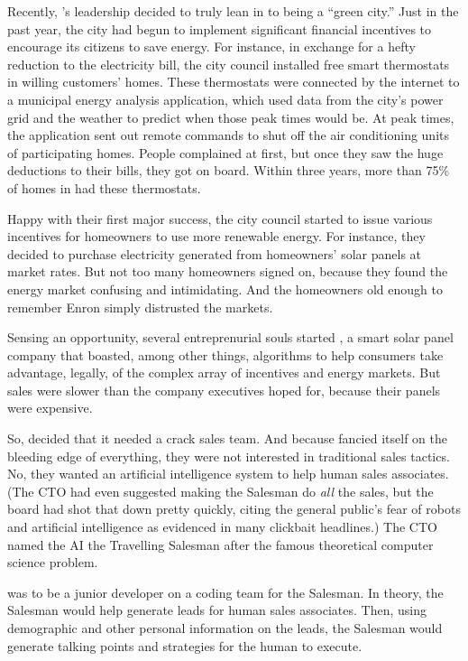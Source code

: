 Recently, \crunchyCity{}'s leadership decided to truly lean in to being a ``green city.'' Just in the past year, the city had begun to implement significant financial incentives to encourage its citizens to save energy. For instance, in exchange for a hefty reduction to the electricity bill, the city council installed free smart thermostats in willing customers' homes. These thermostats were connected by the internet to a municipal energy analysis application, which used data from the city's power grid and the weather to predict when those peak times would be. At peak times, the application sent out remote commands to shut off the air conditioning units of participating homes. People complained at first, but once they saw the huge deductions to their bills, they got on board. Within three years, more than 75\% of homes in \crunchyCity{} had these thermostats.

Happy with their first major success, the city council started to issue various incentives for homeowners to use more renewable energy. For instance, they decided to purchase electricity generated from homeowners' solar panels at market rates. But not too many homeowners signed on, because they found the energy market confusing and intimidating. And the homeowners old enough to remember Enron simply distrusted the markets.

Sensing an opportunity, several entreprenurial souls started \energyCompany{}, a smart solar panel company that boasted, among other things, algorithms to help consumers take advantage, legally, of the complex array of incentives and energy markets. But sales were slower than the company executives hoped for, because their panels were expensive.

So, \energyCompany{} decided that it needed a crack sales team. And because \energyCompany{} fancied itself on the bleeding edge of everything, they were not interested in traditional sales tactics. No, they wanted an artificial intelligence system to help human sales associates. (The \energyCompany{} CTO had even suggested making the Salesman do \emph{all} the sales, but the board had shot that down pretty quickly, citing the general public's fear of robots and artificial intelligence as evidenced in many clickbait headlines.) The CTO named the AI the Travelling Salesman after the famous theoretical computer science problem.

{\protag} was to be a junior developer on a coding team for the Salesman. In theory, the Salesman would help generate leads for human sales associates. Then, using demographic and other personal information on the leads, the Salesman would generate talking points and strategies for the human to execute. 

